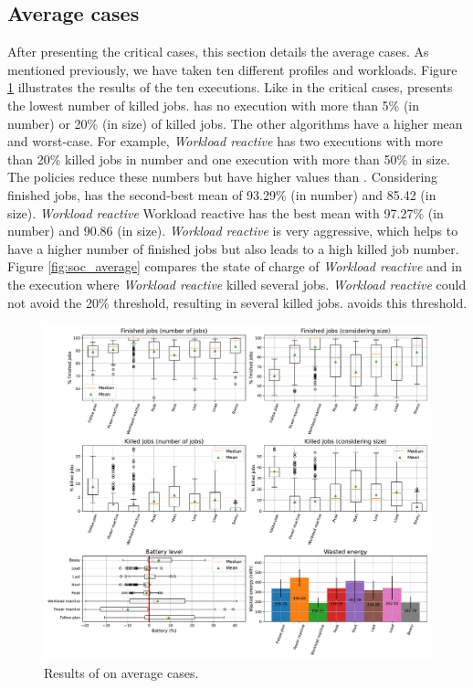 \clearpage

\subsection{Average cases}

After presenting the critical cases, this section details the average cases. As mentioned previously, we have taken ten different profiles and workloads. Figure \ref{fig:beasy_average} illustrates the results of the ten executions. Like in the critical cases, \emph{\systemName} presents the lowest number of killed jobs. \emph{\systemName} has no execution with more than 5\% (in number) or 20\% (in size) of killed jobs. The other algorithms have a higher mean and worst-case. For example, \emph{Workload reactive} has two executions with more than 20\% killed jobs in number and one execution with more than 50\% in size. The policies reduce these numbers but have higher values than \emph{\systemName}. Considering finished jobs, \emph{\systemName} has the second-best mean of 93.29\% (in number) and 85.42 (in size). \emph{Workload reactive} Workload reactive has the best mean with 97.27\% (in number) and 90.86 (in size). \emph{Workload reactive} is very aggressive, which helps to have a higher number of finished jobs but also leads to a high killed job number. Figure \ref{fig:soc_average} compares the state of charge of \emph{Workload reactive} and \emph{\systemName} in the execution where \emph{Workload reactive} killed several jobs. \emph{Workload reactive} could not avoid the 20\% threshold, resulting in several killed jobs. \emph{\systemName} avoids this threshold.

\begin{figure}[!htb]
    \centering
    \includegraphics[scale=0.39]{Images/Heuristic/100_cases.pdf}
    \caption{Results of \emph{\systemName} on average cases.}
    \label{fig:beasy_average}
\end{figure}

